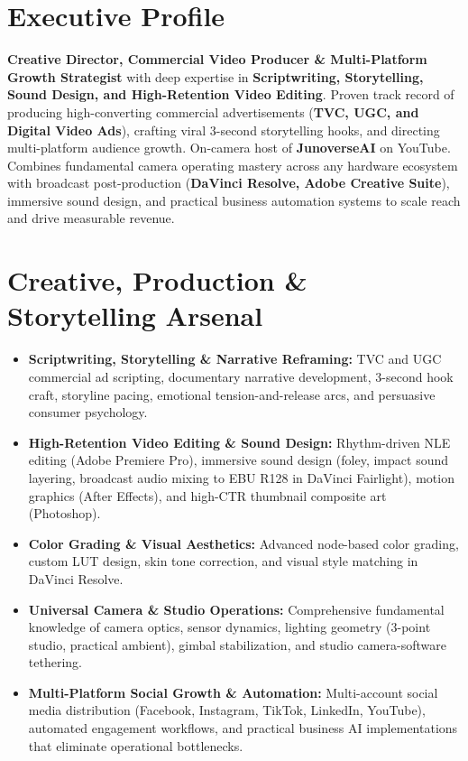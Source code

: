 \documentclass[11pt,a4paper,sans]{moderncv}
\begin{document}
\makecvtitle
\vspace{-1.5em}

\section{Executive Profile}
\textbf{Creative Director, Commercial Video Producer \& Multi-Platform Growth Strategist} with deep expertise in \textbf{Scriptwriting, Storytelling, Sound Design, and High-Retention Video Editing}. Proven track record of producing high-converting commercial advertisements (\textbf{TVC, UGC, and Digital Video Ads}), crafting viral 3-second storytelling hooks, and directing multi-platform audience growth. On-camera host of \textbf{JunoverseAI} on YouTube. Combines fundamental camera operating mastery across any hardware ecosystem with broadcast post-production (\textbf{DaVinci Resolve, Adobe Creative Suite}), immersive sound design, and practical business automation systems to scale reach and drive measurable revenue.

\section{Creative, Production \& Storytelling Arsenal}
\begin{itemize}[leftmargin=1.2em, itemsep=2.5pt]
  \item \textbf{Scriptwriting, Storytelling \& Narrative Reframing:} TVC and UGC commercial ad scripting, documentary narrative development, 3-second hook craft, storyline pacing, emotional tension-and-release arcs, and persuasive consumer psychology.
  \item \textbf{High-Retention Video Editing \& Sound Design:} Rhythm-driven NLE editing (Adobe Premiere Pro), immersive sound design (foley, impact sound layering, broadcast audio mixing to EBU R128 in DaVinci Fairlight), motion graphics (After Effects), and high-CTR thumbnail composite art (Photoshop).
  \item \textbf{Color Grading \& Visual Aesthetics:} Advanced node-based color grading, custom LUT design, skin tone correction, and visual style matching in DaVinci Resolve.
  \item \textbf{Universal Camera \& Studio Operations:} Comprehensive fundamental knowledge of camera optics, sensor dynamics, lighting geometry (3-point studio, practical ambient), gimbal stabilization, and studio camera-software tethering.
  \item \textbf{Multi-Platform Social Growth \& Automation:} Multi-account social media distribution (Facebook, Instagram, TikTok, LinkedIn, YouTube), automated engagement workflows, and practical business AI implementations that eliminate operational bottlenecks.
\end{itemize}
\end{document}
